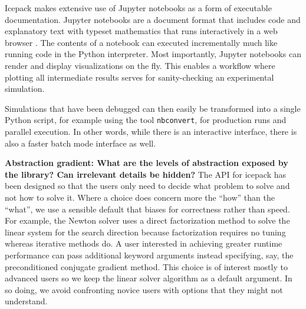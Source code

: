 \documentclass[journal abbreviation, manuscript]{copernicus}
\begin{document}
Icepack makes extensive use of Jupyter notebooks as a form of executable documentation.
Jupyter notebooks are a document format that includes code and explanatory text with typeset mathematics that runs interactively in a web browser \citep{kluyver2016jupyter}.
The contents of a notebook can executed incrementally much like running code in the Python interpreter.
Most importantly, Jupyter notebooks can render and display visualizations on the fly.
This enables a workflow where plotting all intermediate results serves for sanity-checking an experimental simulation.

Simulations that have been debugged can then easily be transformed into a single Python script, for example using the tool \texttt{nbconvert}, for production runs and parallel execution.
In other words, while there is an interactive interface, there is also a faster batch mode interface as well.

\textbf{Abstraction gradient: What are the levels of abstraction exposed by the library?
Can irrelevant details be hidden?}
The API for icepack has been designed so that the users only need to decide what problem to solve and not how to solve it.
Where a choice does concern more the ``how'' than the ``what'', we use a sensible default that biases for correctness rather than speed.
For example, the Newton solver uses a direct factorization method to solve the linear system for the search direction because factorization requires no tuning whereas iterative methods do.
A user interested in achieving greater runtime performance can pass additional keyword arguments instead specifying, say, the preconditioned conjugate gradient method.
This choice is of interest mostly to advanced users so we keep the linear solver algorithm as a default argument.
In so doing, we avoid confronting novice users with options that they might not understand.
\end{document}
